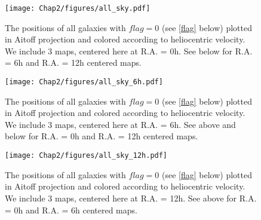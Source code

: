 

\begin{figure}[htb!]
        \centering
        \vspace{0pt}
        \texttt{[image: Chap2/figures/all\_sky.pdf]} \label{a}
        \caption{\small{The positions of all galaxies with $flag=0$ (see \ref{flag} below) plotted in Aitoff projection and colored according to heliocentric velocity. We include 3 maps, centered here at R.A. = 0h. See below for R.A. = 6h and R.A. = 12h centered maps.}}
        \label{allskyvhel}
\end{figure}
\begin{figure}[htb!]\ContinuedFloat
        \centering
        \vspace{0pt}      
        \texttt{[image: Chap2/figures/all\_sky\_6h.pdf]} \label{b}
        \caption{\small{The positions of all galaxies with $flag=0$ (see \ref{flag} below) plotted in Aitoff projection and colored according to heliocentric velocity. We include 3 maps, centered here at R.A. = 6h. See above and below for R.A. = 0h and R.A. = 12h centered maps.}}
        \label{allskyvhel}
\end{figure}
\begin{figure}[htb!]\ContinuedFloat
        \centering
        \vspace{0pt}
        \texttt{[image: Chap2/figures/all\_sky\_12h.pdf]} \label{c}
        \caption{\small{The positions of all galaxies with $flag=0$ (see \ref{flag} below) plotted in Aitoff projection and colored according to heliocentric velocity. We include 3 maps, centered here at R.A. = 12h. See above for R.A. = 0h and R.A. = 6h centered maps.}}
        \label{allskyvhel}
\end{figure}



